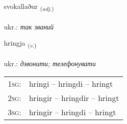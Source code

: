 \documentclass[frontgrid, backgrid]{flacards}\usepackage[]{graphicx}\usepackage[]{xcolor}
\begin{document}
\renewcommand{\flhead}{\vskip5pt \fboxsep=0pt {\small\bfseries\footnotesize Lýsingarorð | прикметник}}
\renewcommand{\fcfoot}{\vskip5pt \fboxsep=0pt \hspace{2pt}{\small\bfseries\footnotesize 1K}}

\renewcommand{\blhead}{\vskip5pt {\small\bfseries\footnotesize Lýsingarorð | прикметник }}
\renewcommand{\bcfoot}{\vskip5pt \hspace{2pt}{\small\bfseries\footnotesize 1K}}


{svokallaður \small{\textsubscript{(\textit{adj.})}} \\[1ex] %
\textphonetic{[svɔːkʰatlaðʏr]} \\
ukr.: \emph{так званий} \\  [2ex]
\renewcommand*{\arraystretch}{0.8}
}

\renewcommand{\flhead}{\vskip5pt \fboxsep=0pt {\small\bfseries\footnotesize Sagnorð | дієслово}}
\renewcommand{\fcfoot}{\vskip5pt \fboxsep=0pt \hspace{2pt}{\small\bfseries\footnotesize 1K}}

\renewcommand{\blhead}{\vskip5pt {\small\bfseries\footnotesize Sagnorð | дієслово }}
\renewcommand{\bcfoot}{\vskip5pt \hspace{2pt}{\small\bfseries\footnotesize 1K}}


{hringja \small{\textsubscript{(\textit{v.})}} \\[1ex] %
\textphonetic{[r̥iɲca]} \\
ukr.: \emph{дзвонити; телефонувати} \\  [2ex]
\renewcommand*{\arraystretch}{0.8}
\begin{tabular}{p{1cm}l}
\textsc{1sg}: & hringi -- hringdi -- hringt \\ 
\textsc{2sg}: & hringir -- hringdir -- hringt \\ 
\textsc{3sg}: & hringir -- hringdi -- hringt \\ 
\end{tabular}
}
\end{document}
